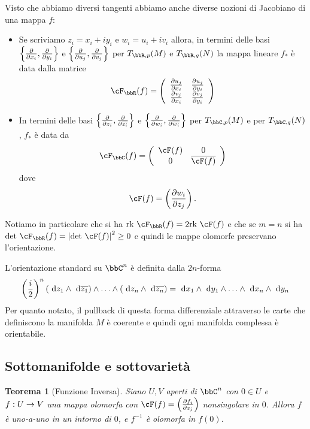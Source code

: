 \documentclass[a4paper,11pt]{article}
\newtheorem{teorema}{Teorema}
\begin{document}
Visto che abbiamo diversi tangenti abbiamo anche diverse nozioni di Jacobiano di una mappa $f$:
\begin{itemize}
\item Se scriviamo $z_i = x_i + i y_i$ e $w_i = u_i + i v_i$ allora, in termini delle basi $\left\{ \dpar{}{x_i}, \dpar{}{y_i} \right\}$ e $\left\{ \dpar{}{u_j}, \dpar{}{v_j} \right\}$ per $T_{\bbR, p}(M)$ e $T_{\bbR, q}(N)$ la mappa lineare $f_*$ è data dalla matrice
  \begin{displaymath}
    \cF_\bbR (f) =
    \left(
      \begin{array}{cc}
        \dpar{u_j}{x_i} & \dpar{u_j}{y_i} \\
        \dpar{v_j}{x_i} & \dpar{v_j}{y_i} \\
      \end{array}
    \right)
  \end{displaymath}

\item In termini delle basi $\left\{ \dpar{}{z_i}, \dpar{}{\overline{z_i}} \right\}$ e $\left\{ \dpar{}{w_i}, \dpar{}{\overline{w_i}} \right\}$ per $T_{\bbC, p}(M)$ e per $T_{\bbC, q}(N)$, $f_*$ è data da
  \begin{displaymath}
    \cF_\bbC (f) =
    \left(
      \begin{array}{cc}
        \cF(f) & 0 \\
        0 & \overline{\cF(f)} \\
      \end{array}
    \right)
  \end{displaymath}
  dove $$ \cF(f) = \left( \dpar{w_i}{z_j} \right).$$
\end{itemize}

Notiamo in particolare che si ha $\Rk \cF_\bbR(f) = 2 \Rk \cF(f)$ e che se $m = n$ si ha $\Det \cF_\bbR(f) = \abs{\Det \cF(f)}^2 \ge 0$ e quindi le mappe olomorfe preservano l'orientazione.

L'orientazione standard su $\bbC^n$ è definita dalla $2n$-forma
$$ \lrt{\frac{i}{2}}^n (\de z_1 \wedge \de \overline{z_1}) \wedge \ldots \wedge (\de z_n \wedge \de \overline{z_n}) = \de x_1 \wedge \de y_1 \wedge \ldots \wedge \de x_n \wedge \de y_n $$
Per quanto notato, il pullback di questa forma differenziale attraverso le carte che definiscono la manifolda $M$ è coerente e quindi ogni manifolda complessa è orientabile.

\subsection{Sottomanifolde e sottovarietà}
\begin{teorema}[Funzione Inversa]
  Siano $U, V$ aperti di $\bbC^n$ con $0 \in U$ e $f: U \rightarrow V$ una mappa olomorfa con $\cF(f) = \lrt{\dpar{f_i}{z_j}}$ nonsingolare in $0$.
  Allora $f$ è uno-a-uno in un intorno di $0$, e $f^{-1}$ è olomorfa in $f(0)$.
\end{teorema}
\end{document}
